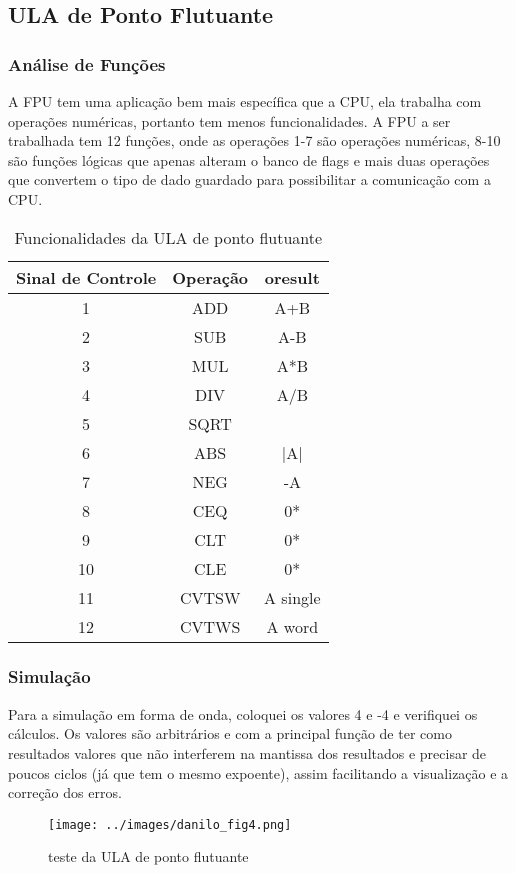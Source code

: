 	
	  

\subsection{ULA de Ponto Flutuante}
	\subsubsection{Análise de Funções}
	A FPU tem uma aplicação bem mais específica que a CPU, ela trabalha com operações numéricas, portanto tem menos funcionalidades. A FPU a ser trabalhada tem 12 funções, onde as operações 1-7 são operações numéricas, 8-10 são funções lógicas que apenas alteram o banco de flags e mais duas operações que convertem o tipo de dado guardado para possibilitar a comunicação com a CPU.
	\begin{table}[H]
		\centering 
		\begin{tabular}{|c|c|c|}\hline
		Sinal de Controle & Operação & oresult \\ \hline
1  & ADD  & A+B \\ \hline
2 &  SUB &  A-B \\ \hline
3 &  MUL &  A*B \\ \hline
4  & DIV &  A/B \\ \hline
5 &  SQRT  & \\ \hline
6 &  ABS &  |A| \\ \hline
7  & NEG &  -A \\ \hline
8  & CEQ &  0* \\ \hline
9 &  CLT  & 0* \\ \hline
10  & CLE & 0* \\ \hline
11  & CVTSW &  A single \\ \hline
12  & CVTWS &  A word \\ \hline
		\end{tabular}
		\caption{Funcionalidades da ULA de ponto flutuante}
	\end{table}
	
	\subsubsection{Simulação}
	Para a simulação em forma de onda, coloquei os valores 4 e -4 e verifiquei os cálculos. Os valores são arbitrários e com a principal função de ter como resultados valores que não interferem na mantissa dos resultados e precisar de poucos ciclos (já que tem o mesmo expoente), assim facilitando a visualização e a correção dos erros.
	  \begin{figure}[H]
	                 \centering
	                 \texttt{[image: ../images/danilo\_fig4.png]}
	                \caption{teste da ULA de ponto flutuante}
	         \end{figure}
	         
